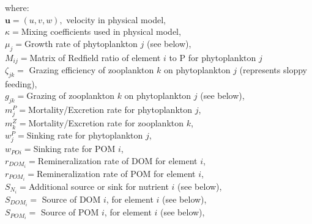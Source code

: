 \documentclass[11pt,letterpaper,english]{article}
\begin{document}
where:\\
\mbox{} \hspace{.5cm} $\textbf{u}=(u,v,w),$ velocity in physical model, \\
\mbox{} \hspace{.5cm} $\kappa=$Mixing coefficients used in physical model,\\
\mbox{} \hspace{.5cm} $\mu_j=$Growth rate of phytoplankton $j$ (see below),\\
\mbox{} \hspace{.5cm} $M_{ij}=$Matrix of Redfield ratio of element $i$ to P
for phytoplankton $j$\\
\mbox{} \hspace{.5cm} $\zeta_{jk}=$ Grazing efficiency of zooplankton $k$ on phytoplankton $j$ (represents sloppy feeding), \\
\mbox{} \hspace{.5cm} $g_{jk}=$Grazing of zooplankton $k$ on phytoplankton $j$ (see below),\\
\mbox{} \hspace{.5cm} $m_j^P=$Mortality/Excretion rate for phytoplankton $j$,\\
\mbox{} \hspace{.5cm} $m_k^Z=$Mortality/Excretion rate for zooplankton $k$,\\
\mbox{} \hspace{.5cm} $w_j^P=$Sinking rate for phytoplankton $j$,\\
\mbox{} \hspace{.5cm} $w_{POi}=$Sinking rate for POM $i$,\\
\mbox{} \hspace{.5cm} $r_{DOM_i}=$Remineralization rate of DOM for element
$i$,\\
\mbox{} \hspace{.5cm} $r_{POM_i}=$Remineralization rate of POM for element
$i$,\\
\mbox{} \hspace{.5cm} $S_{N_i}=$Additional source or sink for nutrient $i$
(see below),\\
\mbox{} \hspace{.5cm} $S_{DOM_i}=$ Source of DOM $i$,
for element $i$ (see below),\\
\mbox{} \hspace{.5cm} $S_{POM_i}=$ Source of POM $i$,
for element $i$ (see below),\\



\vspace{.2cm}
\end{document}
